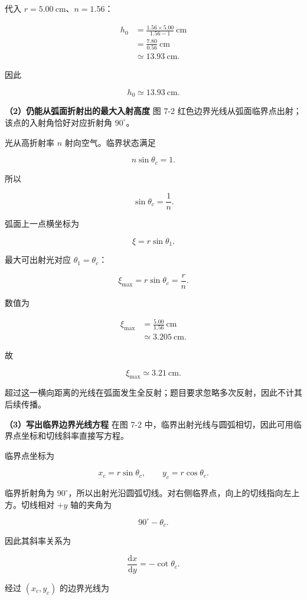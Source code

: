 \documentclass[12pt,a4paper,UTF8]{ctexart}
\begin{document}
代入 \(r=5.00\ \mathrm{cm}\)、\(n=1.56\)：

\[
\begin{aligned}
h_0
&=\frac{1.56\times5.00}{1.56-1}\ \mathrm{cm}\\
&=\frac{7.80}{0.56}\ \mathrm{cm}\\
&\simeq13.93\ \mathrm{cm}.
\end{aligned}
\]

因此

\[\boxed{h_0\simeq13.93\ \mathrm{cm}}.\]

\textbf{（2）仍能从弧面折射出的最大入射高度} 图 7-2
红色边界光线从弧面临界点出射；该点的入射角恰好对应折射角 \(90^\circ\)。

光从高折射率 \(n\) 射向空气。临界状态满足

\[
n\sin\theta_c=1.
\]

所以

\[
\boxed{\sin\theta_c=\frac1n}.
\]

弧面上一点横坐标为

\[\xi=r\sin\theta_1.\]

最大可出射光对应 \(\theta_1=\theta_c\)：

\[
\xi_{\max}=r\sin\theta_c=\frac rn.
\]

数值为

\[
\begin{aligned}
\xi_{\max}
&=\frac{5.00}{1.56}\ \mathrm{cm}\\
&\simeq3.205\ \mathrm{cm}.
\end{aligned}
\]

故

\[\boxed{\xi_{\max}\simeq3.21\ \mathrm{cm}}.\]

超过这一横向距离的光线在弧面发生全反射；题目要求忽略多次反射，因此不计其后续传播。

\textbf{（3）写出临界边界光线方程} 在图 7-2
中，临界出射光线与圆弧相切，因此可用临界点坐标和切线斜率直接写方程。

临界点坐标为

\[
x_c=r\sin\theta_c,
\qquad
y_c=r\cos\theta_c.
\]

临界折射角为
\(90^\circ\)，所以出射光沿圆弧切线。对右侧临界点，向上的切线指向左上方。切线相对
\(+y\) 轴的夹角为

\[90^\circ-\theta_c.\]

因此其斜率关系为

\[
\frac{\mathrm{d}x}{\mathrm{d}y}=-\cot\theta_c.
\]

经过 \((x_c,y_c)\) 的边界光线为
\end{document}
